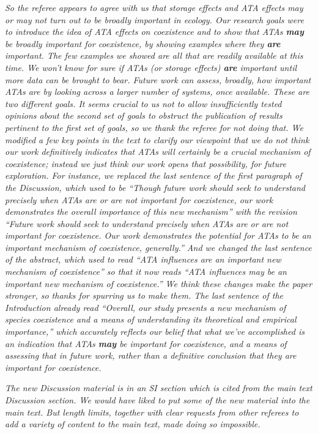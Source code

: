 \documentclass[letterpaper,11pt]{article}
\begin{document}
\emph{So the referee appears to agree with us that storage effects and ATA effects may or may not turn
out to be broadly important in ecology. Our research goals were to introduce the idea of ATA effects on
coexistence and to show that ATAs \textbf{may} be broadly important for coexistence, by showing examples where they
\textbf{are} important. The few examples we showed are all that are readily available at this time.
We won't know for sure if ATAs (or storage effects) \textbf{are} important until more data can be brought to bear. 
Future work can assess, broadly, how important ATAs are by looking across a larger number of systems, once
available. These are two different goals. It seems crucial to us not to allow insufficiently tested 
opinions about the second set of goals to obstruct the publication of results pertinent to the first set of 
goals, so we thank the referee for not doing that. We modified a few key points in the text to clarify 
our viewpoint that we do not think our work definitively indicates that ATAs will certainly be a crucial
mechanism of coexistence; instead we just think our work opens that possibility, for future exploration.
For instance, we replaced the last sentence of the first paragraph of the Discussion, which used to be
``Though future work should seek to understand precisely when ATAs are or are not important
for coexistence, our work demonstrates the overall importance of this new mechanism'' with the revision
``Future work should seek to understand precisely when ATAs are or are not important
for coexistence. Our work demonstrates the potential for ATAs to be an important mechanism of coexistence, generally.''
And we changed the last sentence of the abstract, which used to read ``ATA influences are an important new 
mechanism of coexistence'' so that it now reads ``ATA influences may be an important new mechanism of coexistence.''
We think these changes make the paper stronger, so thanks for spurring us to make them. The last
sentence of the Introduction already read ``Overall, our study presents a new mechanism of species coexistence
and a means of understanding its theoretical and empirical importance,'' which accurately reflects our belief
that what we've accomplished is an indication that ATAs \textbf{may} be important for coexistence, 
and a means of assessing
that in future work, rather than a definitive conclusion that they are important for coexistence.}

\emph{The new Discussion material is in an SI section which is cited from the main text Discussion section. 
We would have liked to put some of the new material into the main text. But length limits, together with
clear requests from other referees to add a variety of content to the main text, made doing so impossible.} \\
\end{document}
